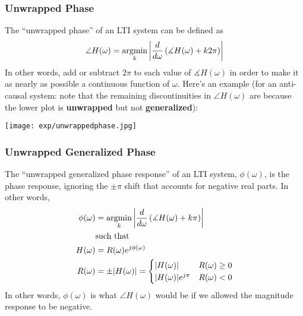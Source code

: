\documentclass{beamer}
\newcommand{\argmin}{\operatornamewithlimits{argmin}}
\begin{document}
\begin{frame}
  \frametitle{Unwrapped Phase}

  The ``unwrapped phase'' of an LTI system can be defined as
  \begin{displaymath}
    \angle H(\omega)=\argmin_{k}\left|\frac{d}{d\omega}\left(\measuredangle H(\omega)+k2\pi\right)\right|
  \end{displaymath}
  In other words, add or subtract $2\pi$ to each value of
  $\measuredangle H(\omega)$ in order to make it as nearly as possible
  a continuous function of $\omega$.  Here's an example (for an
  anti-causal system: note that the remaining discontinuities in
  $\angle H(\omega)$ are because the lower plot is {\bf unwrapped} but
  not {\bf generalized}):
  
  \centerline{\texttt{[image: exp/unwrappedphase.jpg]}}
\end{frame}

\begin{frame}
  \frametitle{Unwrapped Generalized Phase}

  The ``unwrapped generalized phase response'' of an LTI system,
  $\phi(\omega)$, is the phase response, ignoring the $\pm\pi$ shift
  that accounts for negative real parts.  In other words,
  \begin{align*}
    \phi(\omega) &= \argmin_{k}\left|\frac{d}{d\omega}\left(\measuredangle H(\omega)+k\pi\right)\right|\\
    &\text{such that}\\
    H(\omega) &= R(\omega) e^{j\phi(\omega)}\\
    R(\omega) &= \pm |H(\omega)| =
    \begin{cases}|H(\omega)|&R(\omega)\ge 0\\|H(\omega)|e^{j\pi} & R(\omega)<0\end{cases}
  \end{align*}
  In other words, $\phi(\omega)$ is what $\angle H(\omega)$ would be
  if we allowed the magnitude response to be negative.
\end{frame}
\end{document}
